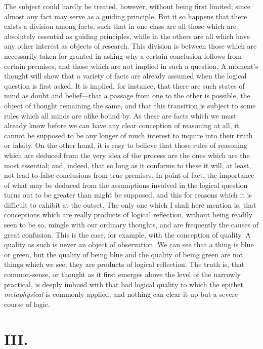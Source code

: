 The subject could hardly be treated, however, without being first
limited; since almost any fact may serve as a guiding principle. But
it so happens that there exists a division among facts, such that in
one class are all those which are absolutely essential as guiding
principles, while in the others are all which have any other interest
as objects of research. This division is between those which are
necessarily taken for granted in asking why a certain conclusion
follows from certain premises, and those which are not implied in such
a question. A moment's thought will show that a variety of facts are
already assumed when the logical question is first asked. It is
implied, for instance, that there are such states of mind as doubt and
be\-lief---that a passage from one to the other is possible, the
object of thought remaining the same, and that this transition is
subject to some rules which all minds are alike bound by. As these are
facts  which we must already know before we can have any clear
conception of reasoning at all, it cannot be supposed to be any longer
of much interest to inquire into their truth or falsity. On the other
hand, it is easy to believe that those rules of reasoning which are
deduced from the very idea of the process are the ones which are the
most essential; and, indeed, that so long as it conforms to these it
will, at least, not lead to false conclusions from true premises. In
point of fact, the importance of what may be deduced from the
assumptions involved in the logical question turns out to be greater
than might be supposed, and this for reasons which it is difficult to
exhibit at the outset. The only one which I shall here mention is,
that conceptions which are really products of logical reflection,
without being readily seen to be so, mingle with our ordinary
thoughts, and are frequently the causes of great confusion. This is
the case, for example, with the conception of quality. A quality as
such is never an object of observation. We can see that a thing is
blue or green, but the quality of being blue and the quality of being
green are not things which we see; they are products of logical
reflection. The truth is, that common-sense, or thought as it first
emerges above the level of the narrowly practical, is deeply imbued
with that bad logical quality to which the epithet
\textit{metaphysical} is commonly applied; and nothing can clear it up
but a severe course of logic.

\section*{III.}

